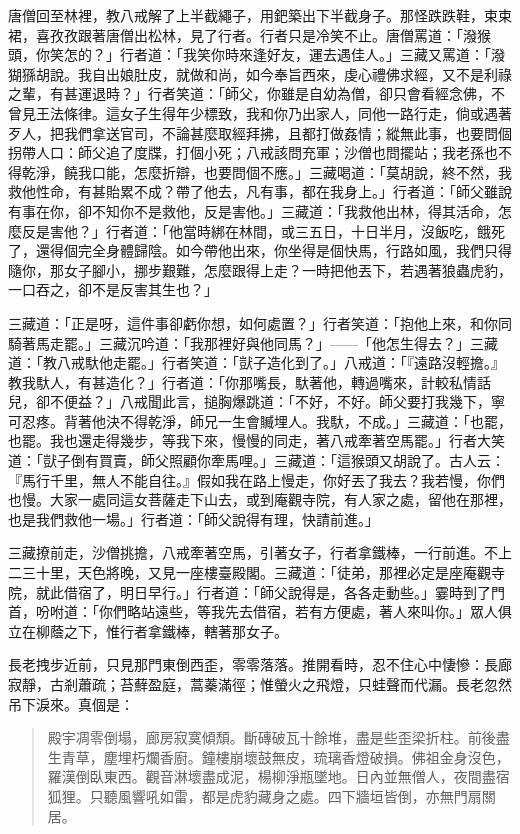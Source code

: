 唐僧回至林裡，教八戒解了上半截繩子，用鈀築出下半截身子。那怪跌跌鞋，束束裙，喜孜孜跟著唐僧出松林，見了行者。行者只是冷笑不止。唐僧罵道：「潑猴頭，你笑怎的？」行者道：「我笑你時來逢好友，運去遇佳人。」三藏又罵道：「潑猢猻胡說。我自出娘肚皮，就做和尚，如今奉旨西來，虔心禮佛求經，又不是利祿之輩，有甚運退時？」行者笑道：「師父，你雖是自幼為僧，卻只會看經念佛，不曾見王法條律。這女子生得年少標致，我和你乃出家人，同他一路行走，倘或遇著歹人，把我們拿送官司，不論甚麼取經拜拂，且都打做姦情；縱無此事，也要問個拐帶人口：師父追了度牒，打個小死；八戒該問充軍；沙僧也問擺站；我老孫也不得乾淨，饒我口能，怎麼折辯，也要問個不應。」三藏喝道：「莫胡說，終不然，我救他性命，有甚貽累不成？帶了他去，凡有事，都在我身上。」行者道：「師父雖說有事在你，卻不知你不是救他，反是害他。」三藏道：「我救他出林，得其活命，怎麼反是害他？」行者道：「他當時綁在林間，或三五日，十日半月，沒飯吃，餓死了，還得個完全身體歸陰。如今帶他出來，你坐得是個快馬，行路如風，我們只得隨你，那女子腳小，挪步艱難，怎麼跟得上走？一時把他丟下，若遇著狼蟲虎豹，一口吞之，卻不是反害其生也？」

三藏道：「正是呀，這件事卻虧你想，如何處置？」行者笑道：「抱他上來，和你同騎著馬走罷。」三藏沉吟道：「我那裡好與他同馬？」——「他怎生得去？」三藏道：「教八戒馱他走罷。」行者笑道：「獃子造化到了。」八戒道：「『遠路沒輕擔。』教我馱人，有甚造化？」行者道：「你那嘴長，馱著他，轉過嘴來，計較私情話兒，卻不便益？」八戒聞此言，搥胸爆跳道：「不好，不好。師父要打我幾下，寧可忍疼。背著他決不得乾淨，師兄一生會贓埋人。我馱，不成。」三藏道：「也罷，也罷。我也還走得幾步，等我下來，慢慢的同走，著八戒牽著空馬罷。」行者大笑道：「獃子倒有買賣，師父照顧你牽馬哩。」三藏道：「這猴頭又胡說了。古人云：『馬行千里，無人不能自往。』假如我在路上慢走，你好丟了我去？我若慢，你們也慢。大家一處同這女菩薩走下山去，或到庵觀寺院，有人家之處，留他在那裡，也是我們救他一場。」行者道：「師父說得有理，快請前進。」

三藏撩前走，沙僧挑擔，八戒牽著空馬，引著女子，行者拿鐵棒，一行前進。不上二三十里，天色將晚，又見一座樓臺殿閣。三藏道：「徒弟，那裡必定是座庵觀寺院，就此借宿了，明日早行。」行者道：「師父說得是，各各走動些。」霎時到了門首，吩咐道：「你們略站遠些，等我先去借宿，若有方便處，著人來叫你。」眾人俱立在柳蔭之下，惟行者拿鐵棒，轄著那女子。

長老拽步近前，只見那門東倒西歪，零零落落。推開看時，忍不住心中悽慘：長廊寂靜，古剎蕭疏；苔蘚盈庭，蒿蓁滿徑；惟螢火之飛燈，只蛙聲而代漏。長老忽然吊下淚來。真個是：
\begin{quote}
殿宇凋零倒塌，廊房寂寞傾頹。斷磚破瓦十餘堆，盡是些歪梁折柱。前後盡生青草，塵埋朽爛香廚。鐘樓崩壞鼓無皮，琉璃香燈破損。佛祖金身沒色，羅漢倒臥東西。觀音淋壞盡成泥，楊柳淨瓶墜地。日內並無僧人，夜間盡宿狐狸。只聽風響吼如雷，都是虎豹藏身之處。四下牆垣皆倒，亦無門扇關居。
\end{quote}

